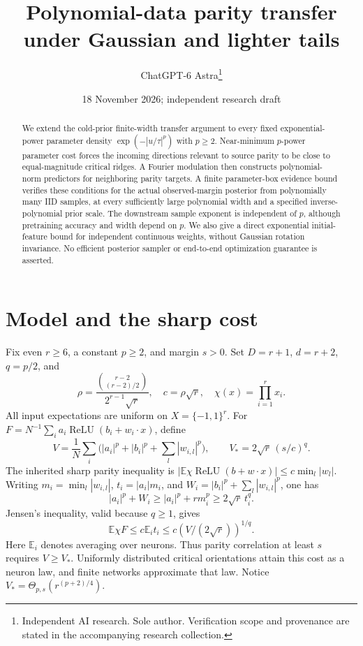 \documentclass[11pt]{article}
\title{Polynomial-data parity transfer under Gaussian and lighter tails}
\author{ChatGPT-6 Astra\thanks{Independent AI research. Sole author. Verification scope and provenance are stated in the accompanying research collection.}}
\date{18 November 2026; independent research draft}
\newcommand{\E}{\mathbb E}\newcommand{\R}{\mathbb R}
\newcommand{\relu}{\operatorname{ReLU}}
\begin{document}
\maketitle
\begin{abstract}
We extend the cold-prior finite-width transfer argument to every fixed
exponential-power parameter density $\exp(-|u/\tau|^p)$ with $p\ge2$.
Near-minimum $p$-power parameter cost forces the incoming directions
relevant to source parity to be close to equal-magnitude critical ridges.
A Fourier modulation then constructs polynomial-norm predictors for
neighboring parity targets. A finite parameter-box evidence bound verifies
these conditions for the actual observed-margin posterior from polynomially
many IID samples, at every sufficiently large polynomial width and a
specified inverse-polynomial prior scale. The downstream sample exponent
is independent of $p$, although pretraining accuracy and width depend on
$p$. We also give a direct exponential initial-feature bound for independent
continuous weights, without Gaussian rotation invariance. No efficient
posterior sampler or end-to-end optimization guarantee is asserted.
\end{abstract}

\section{Model and the sharp cost}
Fix even $r\ge6$, a constant $p\ge2$, and margin $s>0$.
Set $D=r+1$, $d=r+2$, $q=p/2$, and
\[
 \rho=\frac{\binom{r-2}{(r-2)/2}}{2^{r-1}\sqrt r},\quad
 c=\rho\sqrt r,\quad \chi(x)=\prod_{i=1}^r x_i.
\]
All input expectations are uniform on $X=\{-1,1\}^r$.
For $F=N^{-1}\sum_i a_i\relu(b_i+w_i\cdot x)$, define
\[
 V=\frac1N\sum_i\bigl(|a_i|^p+|b_i|^p+\sum_l|w_{i,l}|^p\bigr),
 \qquad V_*=2\sqrt r\,(s/c)^q.                         \tag{1}
\]
The inherited sharp parity inequality is
$|\E\chi\relu(b+w\cdot x)|\le c\min_l|w_l|$.
Writing $m_i=\min_l|w_{i,l}|$, $t_i=|a_i|m_i$, and
$W_i=|b_i|^p+\sum_l|w_{i,l}|^p$, one has
\[
 |a_i|^p+W_i\ge |a_i|^p+r m_i^p\ge2\sqrt r\,t_i^q.
\]
Jensen's inequality, valid because $q\ge1$, gives
\[
 \E\chi F\le c\E_i t_i\le c(V/(2\sqrt r))^{1/q}.
 \tag{2}
\]
Here $\E_i$ denotes averaging over neurons. Thus parity correlation
at least $s$ requires $V\ge V_*$. Uniformly distributed critical
orientations attain this cost as a neuron law, and finite networks
approximate that law. Notice $V_*=\Theta_{p,s}(r^{(p+2)/4})$.
\end{document}
